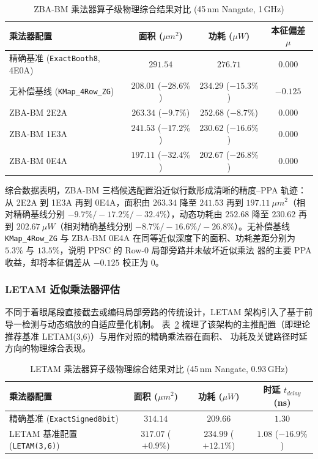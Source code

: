 \documentclass[12pt,a4paper,UTF8]{article}
\begin{document}
\begin{table}[htbp]
    \centering
    \caption{ZBA-BM 乘法器算子级物理综合结果对比 (45\,nm Nangate, 1\,GHz)}
    \label{tab:zbabm-ppa}
    \small
    \setlength{\tabcolsep}{6pt}
    \begin{tabular}{lccc}
        \toprule
        乘法器配置 & 面积 ($\mu m^2$) & 功耗 ($\mu W$) & 本征偏差 $\mu$ \\
        \midrule
        精确基准 (\texttt{ExactBooth8}, 4E0A)  & $291.54$            & $276.71$            & $0.000$  \\
        无补偿基线 (\texttt{KMap\_4Row\_ZG})   & $208.01$ ($-28.6\%$) & $234.29$ ($-15.3\%$) & $-0.125$ \\
        ZBA-BM 2E2A                          & $263.34$ ($-9.7\%$)  & $252.68$ ($-8.7\%$)  & $0.000$  \\
        ZBA-BM 1E3A                          & $241.53$ ($-17.2\%$) & $230.62$ ($-16.6\%$) & $0.000$  \\
        ZBA-BM 0E4A                          & $197.11$ ($-32.4\%$) & $202.67$ ($-26.8\%$) & $0.000$  \\
        \bottomrule
    \end{tabular}
\end{table}

综合数据表明，ZBA-BM 三档候选配置沿近似行数形成清晰的精度--PPA 轨迹：从 2E2A 到 1E3A 再到 0E4A，面积由
 $263.34$ 降至 $241.53$ 再到 $197.11~\mu m^2$（相对精确基线分别 $-9.7\%/-17.2\%/-32.4\%$），动态功耗由 $252.68$ 
 降至 $230.62$ 再到 $202.67~\mu W$（相对精确基线分别 $-8.7\%/-16.6\%/-26.8\%$）。无补偿基线 \texttt{KMap\_4Row\_ZG} 
 与 ZBA-BM 0E4A 在同等近似深度下的面积、功耗差距分别为 $5.3\%$ 与 $13.5\%$，说明 PPSC 的 Row-0 局部旁路并未破坏近似乘法
 器的主要 PPA 收益，却将本征偏差从 $-0.125$ 校正为 $0$。

\subsubsection{LETAM 近似乘法器评估}

不同于着眼尾段直接截去或编码局部旁路的传统设计，LETAM 架构引入了基于前导一检测与动态缩放的自适应量化机制。
表~\ref{tab:letam-ppa} 梳理了该架构的主推配置（即理论推荐基准 LETAM(3,6)）与用作对照的精确乘法器在面积、
功耗及关键路径时延方向的物理综合表现。

\begin{table}[htbp]
    \centering
    \caption{LETAM 乘法器算子级物理综合结果对比 (45\,nm Nangate, 0.93\,GHz)}
    \label{tab:letam-ppa}
    \small
    \setlength{\tabcolsep}{6pt}
    \begin{tabular}{lccc}
        \toprule
        乘法器配置 & 面积 ($\mu m^2$) & 功耗 ($\mu W$) & 时延 $t_{delay}$ (ns) \\
        \midrule
        精确基准 (\texttt{ExactSigned8bit}) & $314.14$            & $209.66$            & $1.30$ \\
        LETAM 基准配置 (\texttt{LETAM(3,6)})  & $317.07$ ($+0.9\%$) & $234.99$ ($+12.1\%$)& $1.08$ ($-16.9\%$) \\
        \bottomrule
    \end{tabular}
\end{table}
\end{document}
